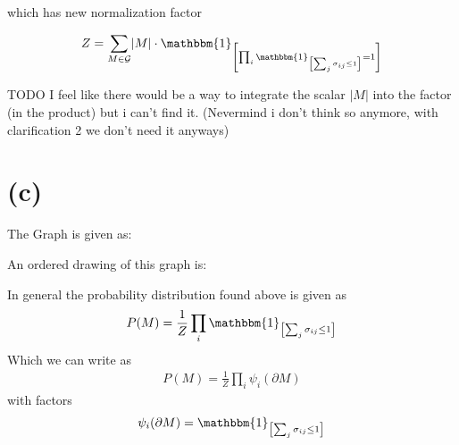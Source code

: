 \documentclass[a4paper]{scrartcl}
\begin{document}
which has new normalization factor

\begin{align}
    Z = \sum_{M \in \mathcal{G}} \lvert M \rvert \cdot \mathbbm{1}_{\left[ \prod_i \mathbbm{1}_{\left[\sum_j \sigma_{ij} \leq 1\right]} = 1 \right]} 
\end{align}




{\color{red}
TODO I feel like there would be a way to integrate the scalar $\lvert M \rvert$ into the factor (in the product) but i can't find it. (Nevermind i don't think so anymore, with clarification 2 we don't need it anyways)
}

\section*{(c)}

The Graph is given as:


An ordered drawing of this graph is:


  





In general the probability distribution found above is given as
\begin{align}
    P(M) = \frac{1}{Z}\prod_i \mathbbm{1}_{\left[\sum_j \sigma_{ij} \leq 1\right]}
\end{align}
Which we can write as 
\begin{align}
    P(M) = \frac{1}{Z} \prod_i \psi_i(\partial M)
\end{align}
with factors
\begin{align}
    \psi_i(\partial M) = \mathbbm{1}_{\left[ \sum_j \sigma_{ij} \leq 1 \right]}
\end{align}
\end{document}
